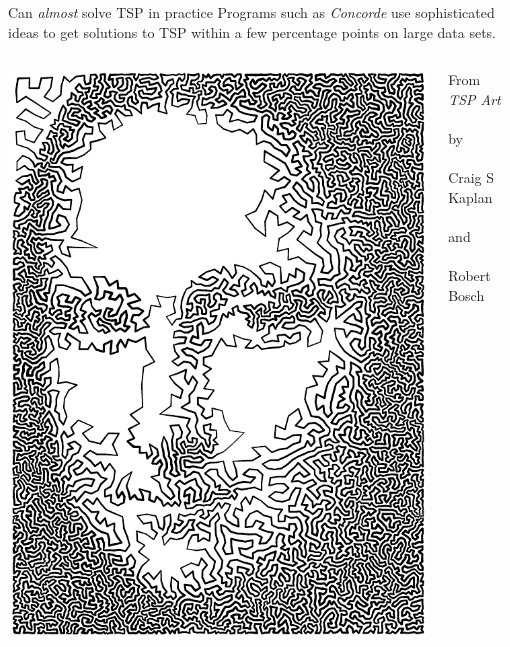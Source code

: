 \documentclass{beamer}
\begin{document}
\begin{frame}{Can \emph{almost} solve TSP in practice}
  Programs such as \emph{Concorde} use sophisticated ideas to get solutions to TSP within a few percentage points on large data sets.
  \begin{columns}
  \begin{column}{.5\textwidth}
\begin{center}    \includegraphics[scale=.5]{mona.pdf} \end{center}
  \end{column}
  \begin{column}{.5\textwidth}
\begin{center}
  From \emph{TSP Art} \\ \\ by\\ \\Craig S Kaplan \\ \\ and\\ \\Robert Bosch
  \end{center}
  \end{column}
  \end{columns}
\end{frame}
\end{document}
